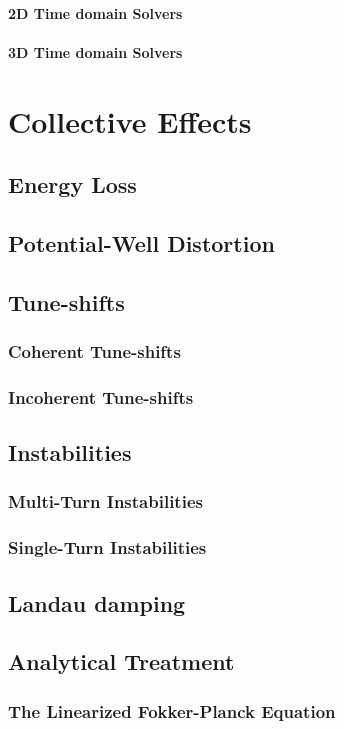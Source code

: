 \documentclass[
	12pt,				%
	openright,			%
	oneside,			%
	a4paper,		%
	chapter=TITLE,		%
	section=TITLE,		%
    brazil,				%
	english,			%
	sumario=tradicional,
	]{abntex2}
\begin{document}
      \subsubsection{2D Time domain Solvers}
      \subsubsection{3D Time domain Solvers}

\chapter{Collective Effects}
  \section{Energy Loss}
  \section{Potential-Well Distortion}
  \section{Tune-shifts}
    \subsection{Coherent Tune-shifts}
    \subsection{Incoherent Tune-shifts}
  \section{Instabilities}
    \subsection{Multi-Turn Instabilities}
    \subsection{Single-Turn Instabilities}
  \section{Landau damping}
  \section{Analytical Treatment}
    \subsection{The Linearized Fokker-Planck Equation}
\end{document}
